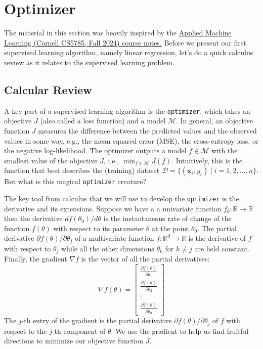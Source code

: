 \documentclass{article}[11pt]
\begin{document}
\section{Optimizer}
The material in this section was heavily inspired by the \href{}{Applied Machine Learning (Cornell CS5785, Fall 2024) course notes.}
Before we present our first supervised learning algorithm, namely linear regression, let's do a quick calculus review as it relates to 
the supervised learning problem. 

\subsection{Calcular Review}
A key part of a supervised learning algorithm is the \texttt{optimizer}, which takes  
an objective $J$ (also called a loss function) and a model $\mathcal{M}$. 
In general, an objective function $J$ measures the difference between the predicted values and the observed values in some way, e.g., the mean squared error (MSE), the cross-entropy loss, or the negative log-likelihood.
The optimizer outputs a model $f \in \mathcal{M}$ with the smallest value of the objective $J$, i.e., $\min_{f \in \mathcal{M}} J(f)$.
Intuitively, this is the function that best describes the (training) dataset
$\mathcal{D} = \{(\mathbf{x}_{i}, y_{i}) \mid i = 1,2,...,n\}$. But what is this magical \texttt{optimizer} creature?

The key tool from calculus that we will use to develop the \texttt{optimizer} is the derivative and its extensions.
Suppose we have a a univariate function $f_{\theta} : \mathbb{R} \to \mathbb{R}$ then the derivative ${d f(\theta_0)}/{d \theta}$
is the instantaneous rate of change of the function $f(\theta)$ with respect to its parameter $\theta$ at the point $\theta_0$.
The partial derivative ${\partial f(\theta)}/{\partial \theta_j}$ of a multivariate function $f : \mathbb{R}^d \to \mathbb{R}$ is the derivative of $f$ with respect to $\theta_j$ 
while all the other dimensions $\theta_k$ for $k\neq j$ are held constant. Finally, the gradient $\nabla f$ is the vector of all the partial derivatives:
\begin{equation}
\nabla f (\theta) = \begin{bmatrix}
\frac{\partial f(\theta)}{\partial \theta_1} \\
\frac{\partial f(\theta)}{\partial \theta_2} \\
\vdots \\
\frac{\partial f(\theta)}{\partial \theta_d}
\end{bmatrix}
\end{equation}
The $j$-th entry of the gradient is the partial derivative ${\partial f(\theta)}/{\partial \theta_j}$ of $f$ with respect to the $j$-th component of $\theta$.
We use the gradient to help us find fruitful directions to minimize our objective function $J$.
\end{document}
